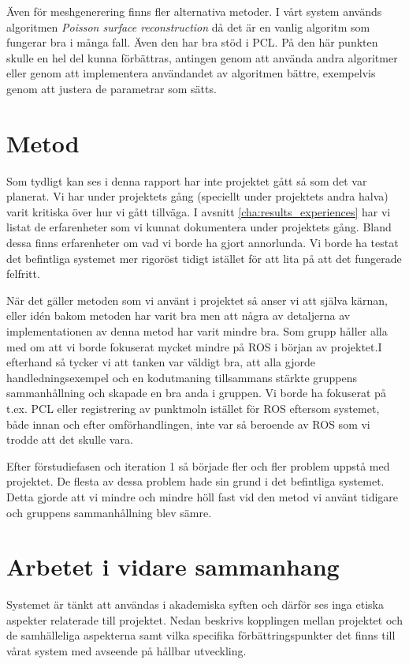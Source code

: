 Även för meshgenerering finns fler alternativa metoder. I vårt system används algoritmen \textit{Poisson surface reconstruction} då det är en vanlig algoritm som fungerar bra i många fall. Även den har bra stöd i PCL. På den här punkten skulle en hel del kunna förbättras, antingen genom att använda andra algoritmer eller genom att implementera användandet av algoritmen bättre, exempelvis genom att justera de parametrar som sätts.


\section{Metod}
\label{sec:discussion-method}
Som tydligt kan ses i denna rapport har inte projektet gått så som det var planerat. Vi har under projektets gång (speciellt under projektets andra halva) varit kritiska över hur vi gått tillväga. I avsnitt \ref{cha:results_experiences} har vi listat de erfarenheter som vi kunnat dokumentera under projektets gång. Bland dessa finns erfarenheter om vad vi borde ha gjort annorlunda. Vi borde ha testat det befintliga systemet mer rigoröst tidigt istället för att lita på att det fungerade felfritt.

När det gäller metoden som vi använt i projektet så anser vi att själva kärnan, eller idén bakom metoden har varit bra men att några av detaljerna av implementationen av denna metod har varit mindre bra. Som grupp håller alla med om att vi borde fokuserat mycket mindre på ROS i början av projektet.I efterhand så tycker vi att tanken var väldigt bra, att alla gjorde handledningsexempel och en kodutmaning tillsammans stärkte gruppens sammanhållning och skapade en bra anda i gruppen. Vi borde ha fokuserat på t.ex. PCL eller registrering av punktmoln istället för ROS eftersom systemet, både innan och efter omförhandlingen, inte var så beroende av ROS som vi trodde att det skulle vara.

Efter förstudiefasen och iteration 1 så började fler och fler problem uppstå med projektet. De flesta av dessa problem hade sin grund i det befintliga systemet. Detta gjorde att vi mindre och mindre höll fast vid den metod vi använt tidigare och gruppens sammanhållning blev sämre.      


\section{Arbetet i vidare sammanhang}
\label{sec:work-wider-context}

Systemet är tänkt att användas i akademiska syften och därför ses inga etiska aspekter relaterade till projektet. Nedan beskrivs kopplingen mellan projektet och de samhälleliga aspekterna samt vilka specifika förbättringspunkter det finns till vårat system med avseende på hållbar utveckling.

